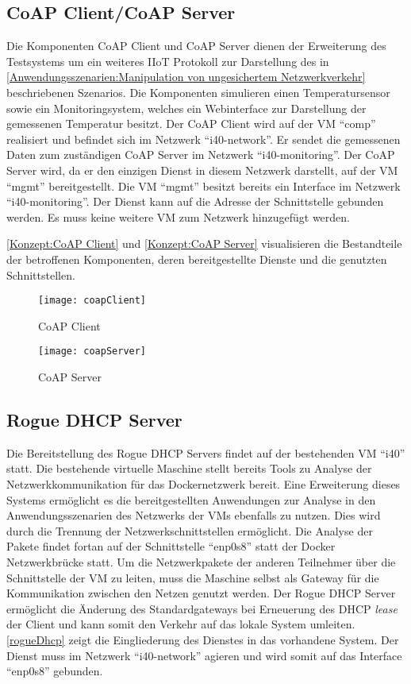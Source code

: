 \subsection{\ac{CoAP} Client/\ac{CoAP} Server}
Die Komponenten \ac{CoAP} Client und \ac{CoAP} Server dienen der Erweiterung des Testsystems um ein weiteres \ac{IIoT} Protokoll zur Darstellung des in \autoref{Anwendungsszenarien:Manipulation von ungesichertem Netzwerkverkehr} beschriebenen Szenarios. Die Komponenten simulieren einen Temperatursensor sowie ein Monitoringsystem, welches ein Webinterface zur Darstellung der gemessenen Temperatur besitzt. Der \ac{CoAP} Client wird auf der \ac{VM} "`comp"' realisiert und befindet sich im Netzwerk "`i40-network"'. Er sendet die gemessenen Daten zum zuständigen \ac{CoAP} Server im Netzwerk "`i40-monitoring"'. Der \ac{CoAP} Server wird, da er den einzigen Dienst in diesem Netzwerk darstellt, auf der \ac{VM} "`mgmt"' bereitgestellt. Die \ac{VM} "`mgmt"' besitzt bereits ein Interface im Netzwerk "`i40-monitoring"'. Der Dienst kann auf die Adresse der Schnittstelle gebunden werden. Es muss keine weitere \ac{VM} zum Netzwerk hinzugefügt werden.

\autoref{Konzept:CoAP Client} und \autoref{Konzept:CoAP Server} visualisieren die Bestandteile der betroffenen Komponenten, deren bereitgestellte Dienste und die genutzten Schnittstellen.

\begin{figure}[h]
  \centering
  \texttt{[image: coapClient]}
  \caption{CoAP Client} 
  \label{Konzept:CoAP Client}
\end{figure}

\begin{figure}[h]
  \centering
  \texttt{[image: coapServer]}
  \caption{CoAP Server} 
  \label{Konzept:CoAP Server}
\end{figure}

\subsection{Rogue \ac{DHCP} Server}
Die Bereitstellung des Rogue \ac{DHCP} Servers findet auf der bestehenden \ac{VM} "`i40"' statt. Die bestehende virtuelle Maschine stellt bereits Tools zu Analyse der Netzwerkkommunikation für das Dockernetzwerk bereit. Eine Erweiterung dieses Systems ermöglicht es die bereitgestellten Anwendungen zur Analyse in den Anwendungsszenarien des Netzwerks der \ac{VM}s ebenfalls zu nutzen. Dies wird durch die Trennung der Netzwerkschnittstellen ermöglicht. Die Analyse der Pakete findet fortan auf der Schnittstelle "`enp0s8"' statt der Docker Netzwerkbrücke statt. Um die Netzwerkpakete der anderen Teilnehmer über die Schnittstelle der \ac{VM} zu leiten, muss die Maschine selbst als Gateway für die Kommunikation zwischen den Netzen genutzt werden. Der Rogue \ac{DHCP} Server ermöglicht die Änderung des Standardgateways bei Erneuerung des \ac{DHCP} \textit{lease} der Client und kann somit den Verkehr auf das lokale System umleiten. \autoref{rogueDhcp} zeigt die Eingliederung des Dienstes in das vorhandene System. Der Dienst muss im Netzwerk "`i40-network"' agieren und wird somit auf das Interface "`enp0s8"' gebunden.

